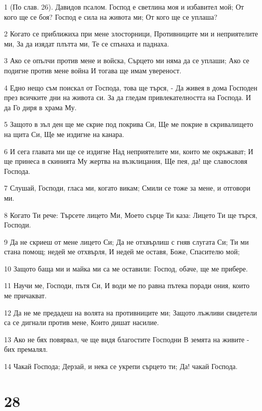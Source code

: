 \par 1 (По слав. 26). Давидов псалом. Господ е светлина моя и избавител мой; От кого ще се боя? Господ е сила на живота ми; От кого ще се уплаша?
\par 2 Когато се приближиха при мене злосторници, Противниците ми и неприятелите ми, За да изядат плътта ми, Те се спънаха и паднаха.
\par 3 Ако се опълчи против мене и войска, Сърцето ми няма да се уплаши; Ако се подигне против мене война И тогава ще имам увереност.
\par 4 Едно нещо съм поискал от Господа, това ще търся, - Да живея в дома Господен през всичките дни на живота си. За да гледам привлекателността на Господа. И да Го диря в храма Му.
\par 5 Защото в зъл ден ще ме скрие под покрива Си, Ще ме покрие в скривалището на щита Си, Ще ме издигне на канара.
\par 6 И сега главата ми ще се издигне Над неприятелите ми, които ме окръжават; И ще принеса в скинията Му жертва на възклицания, Ще пея, да! ще славословя Господа.
\par 7 Слушай, Господи, гласа ми, когато викам; Смили се тоже за мене, и отговори ми.
\par 8 Когато Ти рече: Търсете лицето Ми, Моето сърце Ти каза: Лицето Ти ще търся, Господи.
\par 9 Да не скриеш от мене лицето Си; Да не отхвърлиш с гняв слугата Си; Ти ми стана помощ; недей ме отхвърля, И недей ме оставя, Боже, Спасителю мой;
\par 10 Защото баща ми и майка ми са ме оставили: Господ, обаче, ще ме прибере.
\par 11 Научи ме, Господи, пътя Си, И води ме по равна пътека поради ония, които ме причакват.
\par 12 Да не ме предадеш на волята на противниците ми; Защото лъжливи свидетели са се дигнали против мене, Които дишат насилие.
\par 13 Ако не бях повярвал, че ще видя благостите Господни В земята на живите - бих премалял.
\par 14 Чакай Господа; Дерзай, и нека се укрепи сърцето ти; Да! чакай Господа.

\chapter{28}

